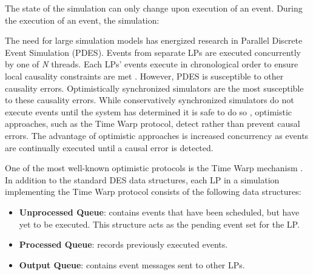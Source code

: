 \documentclass[11pt]{book}
\begin{document}
\noindent
The state of the simulation can only change upon execution of an event.  During the
execution of an event, the simulation: 

\vspace*{-\bigskipamount}

The need for large simulation models has energized research in Parallel Discrete Event
Simulation (PDES).  Events from separate LPs are executed concurrently by one of \emph{N}
threads.  Each LPs' events execute in chronological order to ensure local causality
constraints are met \cite{fujimoto}.  However, PDES is susceptible to other causality
errors.  Optimistically synchronized simulators are the most susceptible to these
causality errors.  While conservatively synchronized simulators do not execute events
until the system has determined it is safe to do so \cite{fujimoto}, optimistic
approaches, such as the Time Warp protocol, detect rather than prevent causal errors. The
advantage of optimistic approaches is increased concurrency as events are continually
executed until a causal error is detected.

One of the most well-known optimistic protocols is the Time Warp mechanism
\cite{fujimoto}.  In addition to the standard DES data structures, each LP in a simulation
implementing the Time Warp protocol consists of the following data structures:

\vspace*{-\bigskipamount}
\begin{singlespace}
\begin{itemize}
  \item \textbf{Unprocessed Queue}: contains events that have been scheduled, but have yet
    to be executed.  This structure acts as the pending event set for the LP.
  \item\textbf{Processed Queue}: records previously executed events.
  \item\textbf{Output Queue}: contains event messages sent to other LPs.
\end{itemize}
\end{singlespace}
\end{document}
